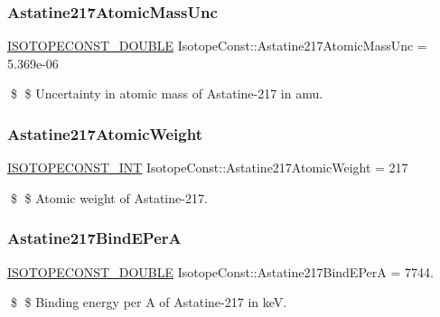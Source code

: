 \subsubsection{\texorpdfstring{Astatine217\+Atomic\+Mass\+Unc}{Astatine217AtomicMassUnc}}
{\footnotesize\ttfamily \mbox{\hyperlink{group___isotope_const-_macros_ga8f45a7272ce02c0b4c65c44636ed719a}{I\+S\+O\+T\+O\+P\+E\+C\+O\+N\+S\+T\+\_\+\+D\+O\+U\+B\+LE}} Isotope\+Const\+::\+Astatine217\+Atomic\+Mass\+Unc = 5.\+369e-\/06}

\$ \$ Uncertainty in atomic mass of Astatine-\/217 in amu. \mbox{\label{group___isotope_const-_astatine-_at217_gacc31bb8348d066fb227eea5fc9e509d9}} 
\subsubsection{\texorpdfstring{Astatine217\+Atomic\+Weight}{Astatine217AtomicWeight}}
{\footnotesize\ttfamily \mbox{\hyperlink{group___isotope_const-_macros_ga5f18360b3e99483a35c32d789e62621c}{I\+S\+O\+T\+O\+P\+E\+C\+O\+N\+S\+T\+\_\+\+I\+NT}} Isotope\+Const\+::\+Astatine217\+Atomic\+Weight = 217}

\$ \$ Atomic weight of Astatine-\/217. \mbox{\label{group___isotope_const-_astatine-_at217_ga2f2519c9d7d2d22164676901392f89f2}} 
\subsubsection{\texorpdfstring{Astatine217\+Bind\+E\+PerA}{Astatine217BindEPerA}}
{\footnotesize\ttfamily \mbox{\hyperlink{group___isotope_const-_macros_ga8f45a7272ce02c0b4c65c44636ed719a}{I\+S\+O\+T\+O\+P\+E\+C\+O\+N\+S\+T\+\_\+\+D\+O\+U\+B\+LE}} Isotope\+Const\+::\+Astatine217\+Bind\+E\+PerA = 7744.}

\$ \$ Binding energy per A of Astatine-\/217 in keV. \mbox{\label{group___isotope_const-_astatine-_at217_ga646d4ae86502d9a88c849e32adace59f}} 
